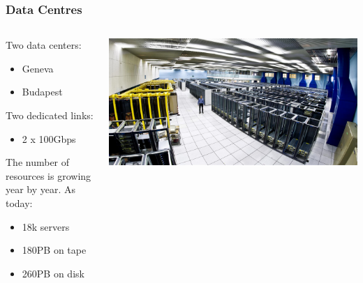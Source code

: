 \documentclass[aspectratio=169]{beamer}
\begin{document}

\begin{frame}
    \frametitle{Data Centres}
    \begin{minipage}[t]{0.95\textwidth}
        \begin{columns}[T]
            \begin{column}{0.5\textwidth}
                Two data centers:
                \begin{itemize}
                    \item Geneva
                    \item Budapest
                \end{itemize}
                Two dedicated links:
                \begin{itemize}
                    \item 2 x 100Gbps
                \end{itemize}
                \vspace{0.1in}
                The number of resources is growing year by year.
                As today:
                \begin{itemize}
                    \item 18k servers
                    \item 180PB on tape
                    \item 260PB on disk
                \end{itemize}
            \end{column}
            \begin{column}{0.5\textwidth}
                \vspace{0.5in}
                \includegraphics[width=1.1\textwidth]{DC_overview.png}
            \end{column}
        \end{columns}
    \end{minipage}
\end{frame}
\end{document}
